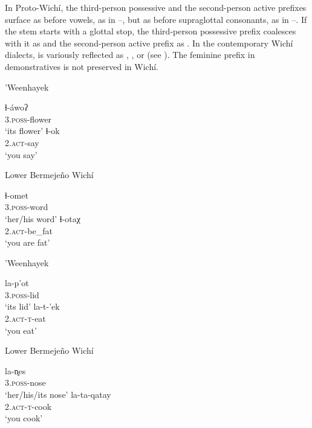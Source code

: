 In Proto-Wichí, the third-person possessive and the second-person active prefixes surface as  before vowels, as in --, but as  before supraglottal consonants, as in --. If the stem starts with a glottal stop, the third-person possessive prefix coalesces with it as  and the second-person active prefix as  . In the contemporary Wichí dialects,  is variously reflected as , , or  (see ). The feminine prefix in demonstratives is not preserved in Wichí.

\ea\label{ex:sylllh:1:whk}
    ’Weenhayek \citep[234, 550]{KC16}
    \begin{xlist}
        \ex\gll ɬ-áwoʔ\\
                3.{\textsc{poss}}-flower\\
                \glt `its flower'
        \ex\gll ɬ-ok \\
                2.{\textsc{act}}-say \\
                \glt `you say'
    \end{xlist}
\z

\ea\label{ex:sylllh:1:lbw}
    Lower Bermejeño Wichí \citep[166, 226]{VN14}
    \begin{xlist}
        \ex\gll ɬ-omet\\
                3.{\textsc{poss}}-word\\
                \glt `her/his word'
        \ex\gll ɬ-otaχ \\
                2.{\textsc{act}}-be\_fat \\
                \glt `you are fat'
    \end{xlist}
\z

\ea\label{ex:sylllh:2:whk}
    ’Weenhayek \citep[220, 438]{KC16}
    \begin{xlist}
        \ex\gll la-p’ot\\
                3.{\textsc{poss}}-lid\\
                \glt `its lid'
        \ex\gll la-t-’ek \\
                2.{\textsc{act}}-\textsc{t}-eat \\
                \glt `you eat'
    \end{xlist}
\z

\newpage
\ea\label{ex:sylllh:2:lbw}
    Lower Bermejeño Wichí \citep[163, 237]{VN14}
    \begin{xlist}
        \ex\gll la-n̥es\\
                3.{\textsc{poss}}-nose\\
                \glt `her/his/its nose'
        \ex\gll la-ta-qatay \\
                2.{\textsc{act}}-\textsc{t}-cook \\
                \glt `you cook'
    \end{xlist}
\z

